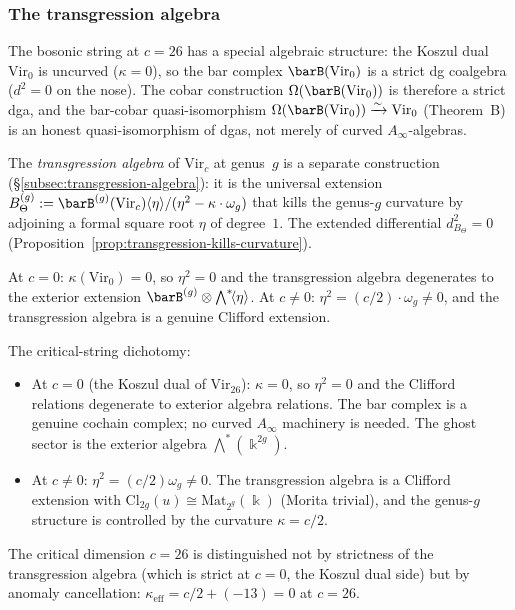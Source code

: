 \subsubsection*{The transgression algebra}

The bosonic string at $c=26$ has a special algebraic structure:
the Koszul dual $\mathrm{Vir}_0$ is uncurved ($\kappa = 0$), so
the bar complex $\barB(\mathrm{Vir}_0)$ is a strict dg coalgebra
($d^2=0$ on the nose). The cobar construction
$\Omega(\barB(\mathrm{Vir}_0))$ is therefore a strict dga, and
the bar-cobar quasi-isomorphism
$\Omega(\barB(\mathrm{Vir}_0))\xrightarrow{\sim}\mathrm{Vir}_0$
(Theorem~B) is an honest quasi-isomorphism of dgas, not merely of
curved $A_\infty$-algebras.

The \emph{transgression algebra} of $\mathrm{Vir}_c$ at genus~$g$
is a separate construction (\S\ref{subsec:transgression-algebra}):
it is the universal extension $B_\Theta^{(g)} :=
\barB^{(g)}(\mathrm{Vir}_c)\langle\eta\rangle/(\eta^2 -
\kappa\cdot\omega_g)$ that kills the genus-$g$ curvature by
adjoining a formal square root $\eta$ of degree~$1$. The
extended differential $d_{B_\Theta}^2 = 0$
(Proposition~\ref{prop:transgression-kills-curvature}).

At $c=0$: $\kappa(\mathrm{Vir}_0) = 0$, so $\eta^2 = 0$ and
the transgression algebra degenerates to the exterior extension
$\barB^{(g)} \otimes \bigwedge^*\!\langle\eta\rangle$. At
$c \neq 0$: $\eta^2 = (c/2)\cdot\omega_g \neq 0$, and the
transgression algebra is a genuine Clifford extension.

The critical-string dichotomy:
\begin{itemize}
\item At $c=0$ (the Koszul dual of $\mathrm{Vir}_{26}$):
 $\kappa = 0$, so $\eta^2 = 0$ and the Clifford relations
 degenerate to exterior algebra relations. The bar complex is a
 genuine cochain complex; no curved $A_\infty$ machinery is needed.
 The ghost sector is the exterior algebra
 $\bigwedge^*(\Bbbk^{2g})$.
\item At $c\neq 0$: $\eta^2 = (c/2)\omega_g \neq 0$. The
 transgression algebra is a Clifford extension with
 $\mathrm{Cl}_{2g}(u) \cong \mathrm{Mat}_{2^g}(\Bbbk)$ (Morita
 trivial), and the genus-$g$ structure is controlled by the
 curvature $\kappa = c/2$.
\end{itemize}
The critical dimension $c=26$ is distinguished not by strictness of
the transgression algebra (which is strict at $c=0$, the Koszul
dual side) but by anomaly cancellation: $\kappa_{\mathrm{eff}} =
c/2 + (-13) = 0$ at $c=26$.

